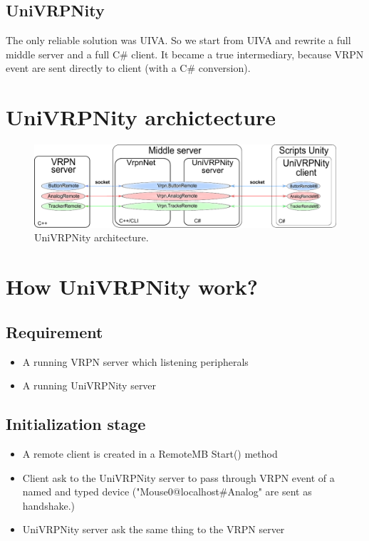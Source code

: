 \documentclass[11pt]{article} %
\begin{document}
\subsection{UniVRPNity}
The only reliable solution was UIVA.
So we start from UIVA and rewrite a full middle server and a full C\# client.
It became a true intermediary, because VRPN event are sent directly to client (with a C\# conversion).

\section{UniVRPNity archictecture}

\begin{figure}[H]
	\includegraphics[scale=0.8]{UniVRPNity.pdf} 
	\caption{UniVRPNity architecture.}
\end{figure}


\section{How UniVRPNity work?}

\subsection{Requirement}
\begin{itemize}
	\item A running VRPN server which listening peripherals
      \item A running UniVRPNity server
\end{itemize}

\subsection{Initialization stage}
\begin{itemize}
	\item A remote client is created in a RemoteMB Start() method
	\item Client ask to the UniVRPNity server to pass through VRPN event of a named and typed device ("Mouse0@localhost\#Analog" are sent as handshake.)
      \item UniVRPNity server ask the same thing to the VRPN server
\end{itemize}
\end{document}
